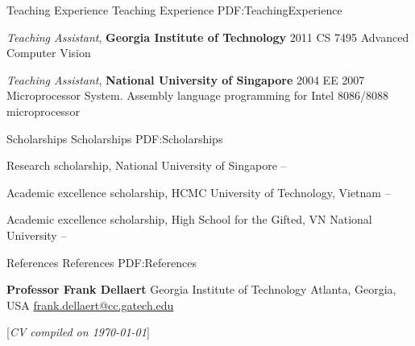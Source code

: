 \documentclass[letterpaper,MMMyyyy,nonstopmode]{simpleresumecv}
\newcommand{\CVNote}{CV compiled on {\today}}
\begin{document}
\begin{Body}

\Section
{Teaching Experience}
{Teaching Experience}
{PDF:TeachingExperience}

\Entry
{\textit{Teaching Assistant}, \textbf{Georgia Institute of Technology}}
\hfill
2011
\Gap
\BulletItem
CS 7495 Advanced Computer Vision

\BigGap
\Entry
{\textit{Teaching Assistant}, \textbf{National University of Singapore}}
\hfill
2004
\Gap
\BulletItem
EE 2007 Microprocessor System. Assembly language programming for Intel 8086/8088 microprocessor



\Section
{Scholarships}
{Scholarships}
{PDF:Scholarships}

\BulletItem
Research scholarship, National University of Singapore
\hfill
{} --

\Gap
\BulletItem
Academic excellence scholarship, HCMC University of Technology, Vietnam
\hfill
{} --

\Gap
\BulletItem
Academic excellence scholarship, High School for the Gifted, VN National University
\hfill
{} --


\endgroup


\Section
{References}
{References}
{PDF:References}

\BulletItem
\textbf{Professor Frank Dellaert}
\newline
Georgia Institute of Technology
\newline
Atlanta, Georgia, USA
\newline
\href{mailto:frank.dellaert@cc.gatech.edu}
{frank.dellaert@cc.gatech.edu}

\end{Body}


\UseNoteFont%
\null\hfill%
[\textit{\CVNote}]
\end{document}
